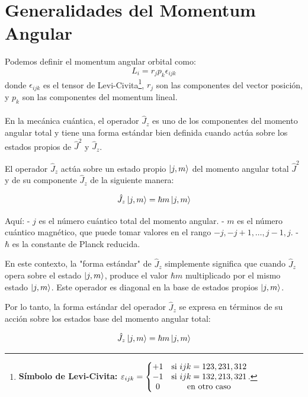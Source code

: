 \section{Generalidades del Momentum Angular}
Podemos definir el momentum angular orbital como:
\begin{equation}
	L_i = r_j p_k \epsilon _{ijk}
\end{equation}
donde $\epsilon _{ijk}$ es el tensor de Levi-Civita\footnote{\textbf{Símbolo de Levi-Civita:} $\varepsilon_{ijk} = \left\{\mqty{+1 & \text{si } ijk= 123,231,312 \\ -1 & \text{si } ijk = 132,213,321 \\ 0 & \text{en otro caso} } \right.$.}, $r_j$ son las componentes del vector posición, y $p_k$ son las componentes del momentum lineal. \\

 \\


En la mecánica cuántica, el operador $\hat{J}_z$ es uno de los componentes del momento angular total y tiene una forma estándar bien definida cuando actúa sobre los estados propios de $\hat{J}^2$ y $\hat{J}_z$. 

El operador $\hat{J}_z$ actúa sobre un estado propio $\ket{j, m}$ del momento angular total $\hat{J}^2$ y de su componente $\hat{J}_z$ de la siguiente manera:

\begin{equation}
\hat{J}_z \ket{j, m} = \hbar m \ket{j, m}
\end{equation}

Aquí:
- $j$ es el número cuántico total del momento angular.
- $m$ es el número cuántico magnético, que puede tomar valores en el rango $-j, -j+1, \ldots, j-1, j$.
- $\hbar$ es la constante de Planck reducida.

En este contexto, la "forma estándar" de $\hat{J}_z$ simplemente significa que cuando $\hat{J}_z$ opera sobre el estado $\ket{j, m}$, produce el valor $\hbar m$ multiplicado por el mismo estado $\ket{j, m}$. Este operador es diagonal en la base de estados propios $\ket{j, m}$.

Por lo tanto, la forma estándar del operador $\hat{J}_z$ se expresa en términos de su acción sobre los estados base del momento angular total:

\begin{equation}
\hat{J}_z \ket{j, m} = \hbar m \ket{j, m}
\end{equation}

